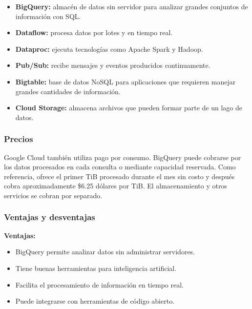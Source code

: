 \begin{itemize}
    \item \textbf{BigQuery:} almacén de datos sin servidor para analizar grandes
    conjuntos de información con SQL.
    
    \item \textbf{Dataflow:} procesa datos por lotes y en tiempo real.
    
    \item \textbf{Dataproc:} ejecuta tecnologías como Apache Spark y Hadoop.
    
    \item \textbf{Pub/Sub:} recibe mensajes y eventos producidos continuamente.
    
    \item \textbf{Bigtable:} base de datos NoSQL para aplicaciones que requieren
    manejar grandes cantidades de información.
    
    \item \textbf{Cloud Storage:} almacena archivos que pueden formar parte de
    un lago de datos.
\end{itemize}

\subsubsection*{Precios}

Google Cloud también utiliza pago por consumo. BigQuery puede cobrarse por los
datos procesados en cada consulta o mediante capacidad reservada. Como
referencia, ofrece el primer TiB procesado durante el mes sin costo y después
cobra aproximadamente \$6.25 dólares por TiB. El almacenamiento y otros
servicios se cobran por separado.

\subsubsection*{Ventajas y desventajas}

\textbf{Ventajas:}

\begin{itemize}
    \item BigQuery permite analizar datos sin administrar servidores.
    \item Tiene buenas herramientas para inteligencia artificial.
    \item Facilita el procesamiento de información en tiempo real.
    \item Puede integrarse con herramientas de código abierto.
\end{itemize}

